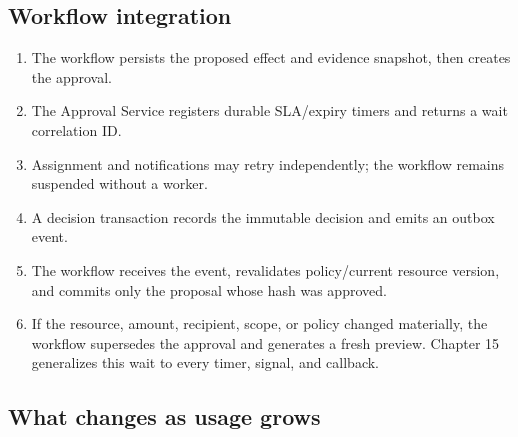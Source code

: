 \subsection{Workflow integration}

\begin{enumerate}

\item The workflow persists the proposed effect and evidence snapshot, then creates the approval.

\item The Approval Service registers durable SLA/expiry timers and returns a wait correlation ID.

\item Assignment and notifications may retry independently; the workflow remains suspended without a worker.

\item A decision transaction records the immutable decision and emits an outbox event.

\item The workflow receives the event, revalidates policy/current resource version, and commits only the proposal whose hash was approved.

\item If the resource, amount, recipient, scope, or policy changed materially, the workflow supersedes the approval and generates a fresh preview. Chapter 15 generalizes this wait to every timer, signal, and callback.

\end{enumerate}

\subsection{What changes as usage grows}

